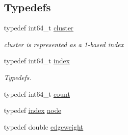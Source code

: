 \subsection*{Typedefs}
\begin{DoxyCompactItemize}
\item 
typedef int64\-\_\-t \hyperlink{namespace_ensemble_clustering_a5ae38234e207add524443be6e597b970}{cluster}
\begin{DoxyCompactList}\small\item\em cluster is represented as a 1-\/based index \end{DoxyCompactList}\item 
typedef int64\-\_\-t \hyperlink{namespace_ensemble_clustering_a1ba11e6d628873b803a26fe054f45e28}{index}
\begin{DoxyCompactList}\small\item\em Typedefs. \end{DoxyCompactList}\item 
typedef int64\-\_\-t \hyperlink{namespace_ensemble_clustering_a2482e94ca22a0c6544a5a9173186fde8}{count}
\item 
typedef \hyperlink{namespace_ensemble_clustering_a1ba11e6d628873b803a26fe054f45e28}{index} \hyperlink{namespace_ensemble_clustering_ae829290aeccd1a420b17a37fd901f114}{node}
\item 
typedef double \hyperlink{namespace_ensemble_clustering_ab3fbffa545e4c22660e80229ca1a7d4a}{edgeweight}
\end{DoxyCompactItemize}
